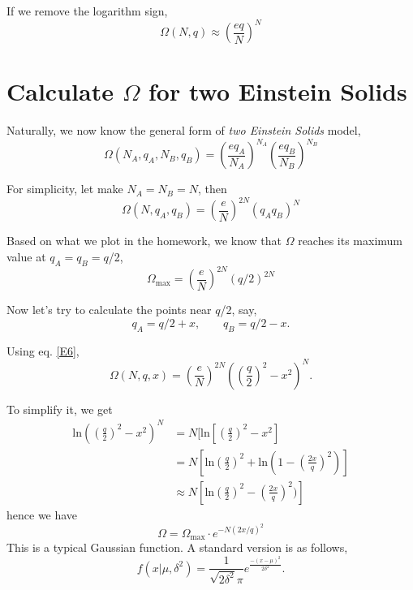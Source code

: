 If we remove the logarithm sign,
\begin{equation} \label{E4}
       \Omega(N,q) \approx (\frac{eq}{N})^N
\end{equation}


\section{Calculate $\Omega$ for two Einstein Solids}
Naturally, we now know the general form of \textit{two Einstein Solids} model,
\begin{equation} \label{E5}
       \Omega(N_A,q_A,N_B,q_B) = (\frac{eq_A}{N_A})^{N_A} (\frac{eq_B}{N_B})^{N_B}
\end{equation}

For simplicity, let make $N_A = N_B = N $, then
\begin{equation} \label{E6}
       \Omega(N,q_A,q_B) = (\frac{e}{N})^{2N} (q_A q_B)^{N}
\end{equation}

Based on what we plot in the homework, we know that $\Omega$ reaches its maximum value at 
$q_A = q_B = q$/2,
\begin{equation}
       \Omega_\text{max} = (\frac{e}{N})^{2N} (q/2)^{2N}
\end{equation}

Now let's try to calculate the points near $q$/2, say,
\begin{equation}
  q_A = q/2+x, ~~~~~~~~~ q_B=q/2-x.
\end{equation}

Using eq. \ref{E6},
\begin{equation} \label{E7}
       \Omega(N,q,x) = (\frac{e}{N})^{2N} ((\frac{q}{2})^2-x^2)^{N}.
\end{equation}

To simplify it, we get
\begin{equation} \label{E8}
\begin{split}
       \text{ln}((\frac{q}{2})^2-x^2)^{N} 
           &= N[\text{ln}[(\frac{q}{2})^2-x^2]\\
           &= N[\text{ln}(\frac{q}{2})^2 + \text{ln}(1-(\frac{2x}{q})^2)]\\
           &\approx N[\text{ln}(\frac{q}{2})^2 - (\frac{2x}{q})^2)]
\end{split}                                          
\end{equation}
hence we have 
\begin{equation} \label{E9}
  \Omega = \Omega_\text{max} \cdot e^{-N(2x/q)^2}
\end{equation}
This is a typical Gaussian function. A standard version is as follows,
\begin{equation}
  f(x|\mu,\delta^2) = \frac{1}{\sqrt{2\delta^2}\pi} e^\frac{-(x-\mu)^2}{2\delta^2}.
\end{equation}


